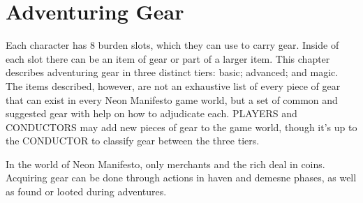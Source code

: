 \section{Adventuring Gear}
Each character has 8 burden slots, which they can use to carry gear. Inside of each slot there can be an item of gear or part of a larger item. This chapter describes adventuring gear in three distinct tiers: basic; advanced; and magic. The items described, however, are not an exhaustive list of every piece of gear that can exist in every Neon Manifesto game world, but a set of common and suggested gear with help on how to adjudicate each. PLAYERS and CONDUCTORS may add new pieces of gear to the game world, though it's up to the CONDUCTOR to classify gear between the three tiers.

In the world of Neon Manifesto, only merchants and the rich deal in coins. Acquiring gear can be done through actions in haven and demesne phases, as well as found or looted during adventures.


